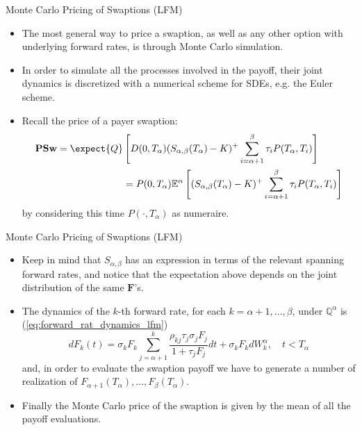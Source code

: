 \documentclass{beamer}
\begin{document}
\begin{frame}{Monte Carlo Pricing of Swaptions (LFM)}
  \begin{itemize}
  \item<1-> The most general way to price a swaption, as well as any other option with underlying forward rates, is through Monte Carlo simulation. 
  \item<2-> In order to simulate all the processes involved in the payoff, their joint dynamics is discretized with a numerical scheme for SDEs, e.g. the Euler scheme.
  \item<3-> Recall the price of a payer swaption:
    \begin{equation*}
      \begin{aligned}
        \textbf{PSw} = \expect{Q}&\left[D(0, T_\alpha) (S_{\alpha,\beta}(T_\alpha) - K)^+ \sum_{i=\alpha+1}^\beta \tau_i P(T_\alpha, T_i)\right] \\
        &= P(0, T_\alpha)\mathbb{E}^\alpha\left[(S_{\alpha, \beta}(T_\alpha) - K)^+ \sum^\beta_{i=\alpha+1} \tau_i P(T_\alpha, T_i)\right]
      \end{aligned}
    \end{equation*}
    by considering this time $P(\cdot, T_\alpha)$ as numeraire.
  \end{itemize}
\end{frame}

\begin{frame}{Monte Carlo Pricing of Swaptions (LFM)}
  \begin{itemize}
  \item<1-> Keep in mind that $S_{\alpha,\beta}$ has an expression in terms of the relevant spanning forward rates, and notice that the expectation above depends on the joint distribution of the same $\bm{F}$’s.
  \item<2-> The dynamics of the $k$-th forward rate, for each $k = \alpha + 1,\ldots, \beta$, under $\mathbb{Q}^\alpha$ is (\cref{eq:forward_rat_dynamics_lfm})
\begin{equation}
  dF_k(t) = \sigma_kF_k\sum_{j=\alpha+1}^k\frac{\rho_{kj}\tau_j\sigma_jF_j}{1+\tau_jF_j}dt+\sigma_kF_k dW^\alpha_k, \quad t<T_\alpha
  \label{eq:dynamics_4.1}
\end{equation}
and, in order to evaluate the swaption payoff we have to generate a number of realization of $F_{\alpha+1}(T_\alpha),\ldots, F_\beta(T_\alpha)$. 
\item<3-> Finally the Monte Carlo price of the swaption is given by the mean of all the payoff evaluations.
  \end{itemize}
\end{frame}
\end{document}
